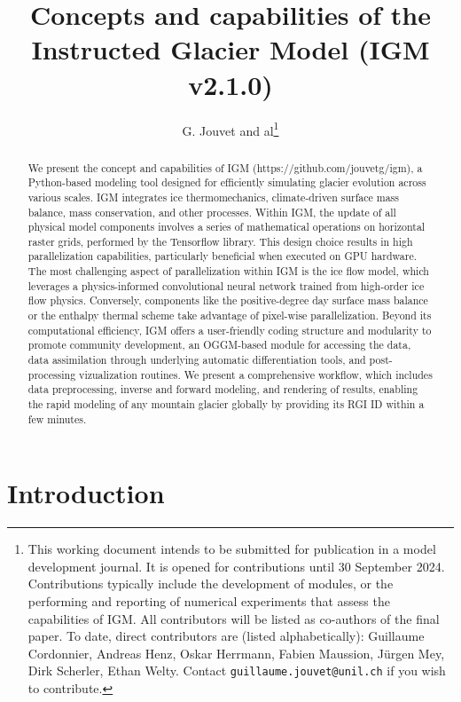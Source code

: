 \documentclass[10pt,twocolumn]{article}
\author{G. Jouvet and al\footnote{This working document intends to be submitted for publication in a model development journal. It is opened for contributions until 30 September 2024. Contributions typically include the development of modules, or the performing and reporting of numerical experiments that assess the capabilities of IGM. All contributors will be listed as co-authors of the final paper. To date, direct contributors are (listed alphabetically): Guillaume Cordonnier, Andreas Henz, Oskar Herrmann, Fabien Maussion, Jürgen Mey, Dirk Scherler, Ethan Welty. Contact \texttt{guillaume.jouvet@unil.ch} if you wish to contribute.}}
\begin{document}
\allowdisplaybreaks 

\title{Concepts and capabilities of the Instructed Glacier Model (IGM v2.1.0)}

\maketitle
 
\begin{abstract}
We present the concept and capabilities of IGM (https://github.com/jouvetg/igm), 
a Python-based modeling tool designed for efficiently simulating glacier evolution 
across various scales. IGM integrates ice thermomechanics, climate-driven surface 
mass balance, mass conservation, and other processes. Within IGM, the update of all physical 
model components involves a series of mathematical operations on horizontal raster grids, 
performed by the Tensorflow library. This design choice results in high parallelization 
capabilities, particularly beneficial when executed on GPU hardware. 
The most challenging aspect of parallelization within IGM is the ice flow model, 
which leverages a physics-informed convolutional neural network 
trained from high-order ice flow physics. Conversely, components like the 
positive-degree day surface mass balance or the enthalpy thermal scheme 
take advantage of pixel-wise parallelization. Beyond its computational efficiency, 
IGM offers a user-friendly coding structure and modularity to promote community 
development, an OGGM-based module for accessing the data, data assimilation through 
underlying automatic differentiation tools, and post-processing vizualization routines. 
We present a comprehensive workflow, which includes data preprocessing, 
inverse and forward modeling, and rendering of results, enabling the rapid modeling 
of any mountain glacier globally by providing its RGI ID within a few minutes. 
\end{abstract}

\section{Introduction} 
\end{document}
